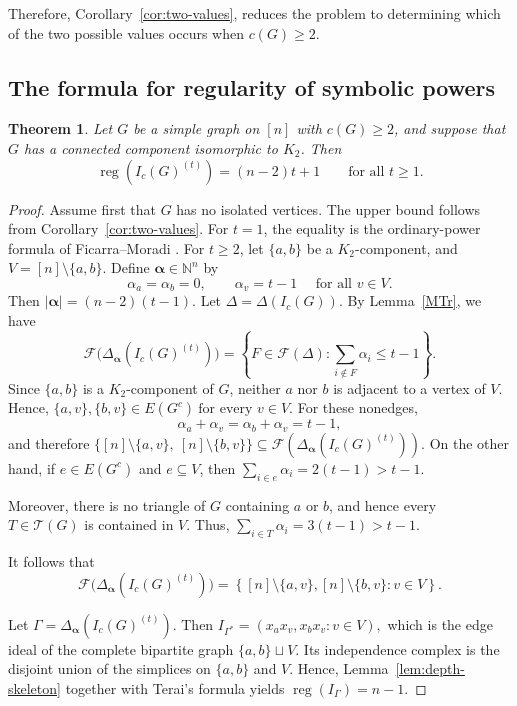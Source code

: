\documentclass[12pt]{amsart}
\newtheorem{theorem}[proposition]{Theorem}
\DeclareMathOperator{\reg}{reg}
\begin{document}
Therefore, Corollary~\ref{cor:two-values}, reduces the problem to determining which of the two possible values occurs when \(c(G)\ge2\).
\subsection{The formula for regularity of symbolic powers}

\begin{theorem}\label{thm:k2-component}
Let $G$ be a simple graph on $[n]$ with $c(G)\ge2$, and suppose that $G$ has a connected component isomorphic to $K_2$. Then
\[
\reg(I_c(G)^{(t)})=(n-2)t+1\qquad \text{for all  } t \ge 1.
\]
\end{theorem}

\begin{proof}
Assume first that $G$ has no isolated vertices. The upper bound follows from Corollary~\ref{cor:two-values}. For $t=1$, the equality is the ordinary-power formula of Ficarra--Moradi \cite[Theorem~4.1]{fm25}. For $t\ge2$, let $\{a,b\}$ be a $K_2$-component, and $V=[n]\setminus\{a,b\}$. Define $\boldsymbol\alpha\in\mathbb N^n$ by
\[
\alpha_a=\alpha_b=0,
\qquad
\alpha_v=t-1\quad \text{ for all } v\in V.
\]
\noindent
Then $|\boldsymbol{\alpha}|=(n-2)(t-1).$
Let \(\Delta=\Delta(I_c(G))\). By Lemma~\ref{MTr}, we have
\[
\mathcal F\bigl(\Delta_{\boldsymbol{\alpha}}(I_c(G)^{(t)})\bigr)
=
\left\{
F\in\mathcal F(\Delta):
\sum_{i\notin F}\alpha_i\le t-1
\right\}.
\]
Since \(\{a,b\}\) is a \(K_2\)-component of \(G\), neither \(a\) nor
\(b\) is adjacent to a vertex of \(V\). Hence, $\{a,v\},\{b,v\}\in E(G^c) \ \text{for every }v\in V.$ For these nonedges,
\[
\alpha_a+\alpha_v
=
\alpha_b+\alpha_v
=
t-1,
\]
and therefore $ \{[n]\setminus\{a,v\}, \  [n]\setminus\{b,v\} \} \subseteq  \mathcal F(\Delta_{\boldsymbol{\alpha}}(I_c(G)^{(t)})).$ On the other hand, if \(e\in E(G^c)\) and \(e\subseteq V\), then $\sum_{i\in e}\alpha_i=2(t-1)>t-1. $ 

Moreover, there is no triangle of \(G\) containing \(a\) or \(b\), and hence every
\(T\in\mathcal T(G)\) is contained in \(V\). Thus, $\sum_{i\in T}\alpha_i=3(t-1)>t-1.$ 

It follows that
\[
\mathcal F\bigl(\Delta_{\boldsymbol{\alpha}}(I_c(G)^{(t)})\bigr)
=
\left\{
[n]\setminus\{a,v\},
[n]\setminus\{b,v\}
:
v\in V
\right\}.
\]

Let $\Gamma=\Delta_{\boldsymbol\alpha}(I_c(G)^{(t)})$. Then \(I_{\Gamma^*}=(x_ax_v,x_bx_v:v\in V),\) which is the edge ideal of the complete bipartite graph $\{a,b\}\sqcup V$. Its independence complex is the disjoint union of the simplices on $\{a,b\}$ and $V$. Hence, Lemma~\ref{lem:depth-skeleton} together with Terai's formula yields $\reg(I_\Gamma)=n-1$.


\end{proof}
\end{document}
